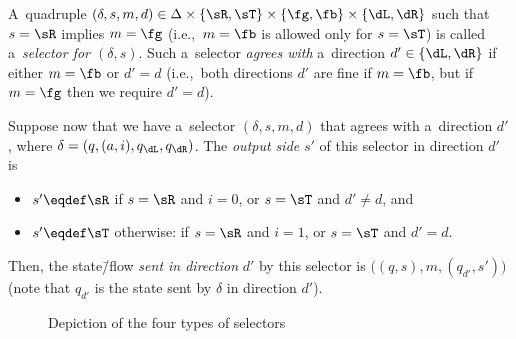 A~quadruple $(\delta,s,m,d)\in\Delta\times\{\sR,\sT\}\times\{\fg,\fb\}\times\{\dL,\dR\}$ such that $s=\sR$ implies $m=\fg$ (i.e.,~$m=\fb$ is allowed only for $s=\sT$)
is called a~\emph{selector for $(\delta,s)$}.
Such a~selector \emph{agrees with} a~direction $d'\in\{\dL,\dR\}$ if either $m=\fb$ or $d'=d$ (i.e.,~both directions $d'$ are fine if $m=\fb$, but if $m=\fg$ then we require $d'=d$).

Suppose now that we have a~selector $(\delta,s,m,d)$ that agrees with a~direction $d'$, where $\delta=(q,(a,i),q_\dL,q_\dR)$.
The \emph{output side} $s'$ of this selector in direction $d'$ is
\begin{itemize}
\item	$s'\eqdef\sR$ if $s=\sR$ and $i=0$, or $s=\sT$ and $d'\neq d$, and
\item	$s'\eqdef\sT$ otherwise: if $s=\sR$ and $i=1$, or $s=\sT$ and $d'=d$.
\end{itemize}
Then, the state\=/flow \emph{sent in direction} $d'$ by this selector is $\big((q,s),m,(q_{d'},s')\big)$ (note that $q_{d'}$ is the state sent by $\delta$ in direction $d'$).


\begin{figure}
\begin{center}
\end{center}
\caption{Depiction of the four types of selectors}
\label{fig:selectors}
\end{figure}

